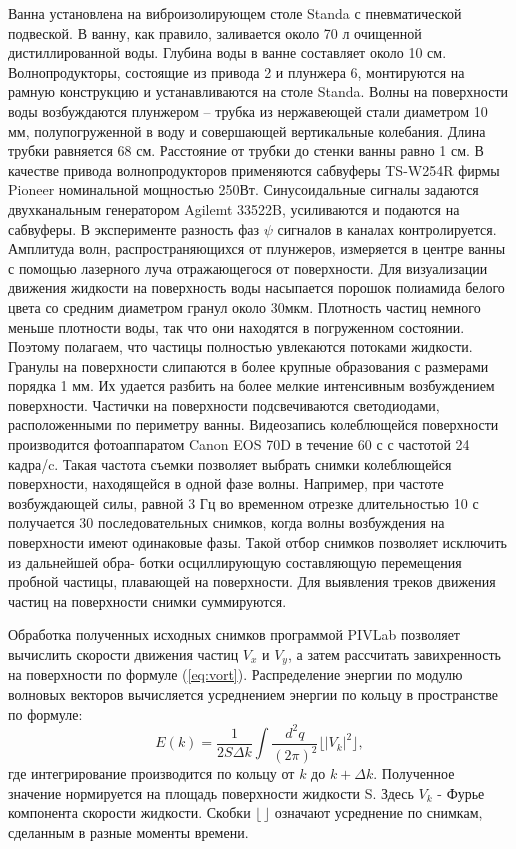 Ванна установлена на виброизолирующем столе Standa с пневматической подвеской. В ванну, как правило, заливается около 70 л очищенной дистиллированной воды. Глубина воды в ванне составляет около 10 см. Волнопродукторы, состоящие из привода 2 и плунжера 6, монтируются на рамную конструкцию и устанавливаются на столе Standa. Волны на поверхности воды возбуждаются плунжером – трубка из нержавеющей стали диаметром 10 мм, полупогруженной в воду и совершающей вертикальные колебания. Длина трубки равняется 68 см. Расстояние от трубки до стенки ванны равно 1 см. В качестве привода волнопродукторов применяются сабвуферы TS-W254R фирмы Pioneer номинальной мощностью 250Вт. Синусоидальные сигналы задаются двухканальным генератором Agilemt 33522B, усиливаются и подаются на сабвуферы. В эксперименте разность фаз $\psi$ сигналов в каналах контролируется. Амплитуда волн, распространяющихся от плунжеров, измеряется в центре ванны с помощью лазерного луча отражающегося от поверхности. Для визуализации движения жидкости на поверхность воды насыпается порошок полиамида белого цвета со средним диаметром гранул около 30мкм. Плотность частиц немного меньше плотности воды, так что они находятся в погруженном состоянии. Поэтому полагаем, что частицы полностью увлекаются потоками жидкости. Гранулы на поверхности слипаются в более крупные образования с размерами порядка 1 мм. Их удается разбить на более мелкие интенсивным возбуждением поверхности. Частички на поверхности подсвечиваются светодиодами, расположенными по периметру ванны. Видеозапись колеблющейся поверхности производится фотоаппаратом Canon EOS 70D в течение 60 с с частотой 24 кадра/c. Такая частота съемки позволяет выбрать снимки колеблющейся поверхности, находящейся в одной фазе волны. Например, при частоте возбуждающей силы, равной 3 Гц во временном отрезке длительностью 10 с получается 30 последовательных снимков, когда волны возбуждения на поверхности имеют одинаковые фазы. Такой отбор снимков позволяет исключить из дальнейшей обра- ботки осциллирующую составляющую перемещения пробной частицы, плавающей на поверхности. Для выявления треков движения частиц на поверхности снимки суммируются.

Обработка полученных исходных снимков программой PIVLab \cite{piv} позволяет вычислить скорости движения частиц $V_x$ и $V_y$, а затем рассчитать завихренность на поверхности по формуле (\ref{eq:vort}). Распределение энергии по модулю волновых векторов вычисляется усреднением энергии по кольцу в пространстве по формуле:
\begin{equation}
E(k) = \frac{1}{ 2 S \Delta k}\int \frac{d^2 q}{(2 \pi)^2} \lfloor |V_k|^2 \rfloor,
\end{equation}
где интегрирование производится по кольцу от ${k}$ до ${k} + \Delta{k}$. Полученное значение нормируется на площадь поверхности жидкости S. Здесь $V_k$ - Фурье компонента скорости жидкости. Скобки $\lfloor \, \rfloor$ означают усреднение по снимкам, сделанным в разные моменты времени.
	
